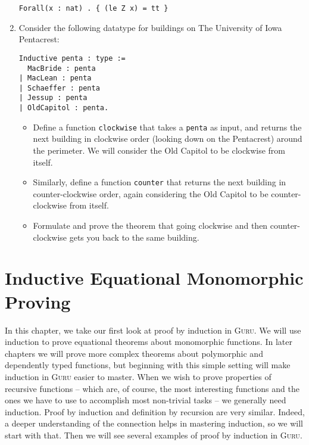 \documentclass{book}[12pt]
\newcommand{\guru}[0]{\textsc{Guru}\xspace}
\begin{document}
\begin{enumerate}
\begin{verbatim}
Forall(x : nat) . { (le Z x) = tt }
\end{verbatim}

\item Consider the following datatype for buildings on The University of Iowa Pentacrest:

\begin{verbatim}
Inductive penta : type :=
  MacBride : penta
| MacLean : penta
| Schaeffer : penta
| Jessup : penta
| OldCapitol : penta.
\end{verbatim}

\begin{itemize}

\item Define a function \texttt{clockwise} that takes a \texttt{penta}
as input, and returns the next building in clockwise order (looking
down on the Pentacrest) around the perimeter.  We will consider the
Old Capitol to be clockwise from itself.

\item Similarly, define a function \texttt{counter} that returns the
next building in counter-clockwise order, again considering the Old
Capitol to be counter-clockwise from itself.

\item Formulate and prove the theorem that going clockwise and then
counter-clockwise gets you back to the same building.

\end{itemize}

\end{enumerate}

\chapter{Inductive Equational Monomorphic Proving}
\label{ch4}

In this chapter, we take our first look at proof by induction in
\guru.  We will use induction to prove equational theorems about
monomorphic functions.  In later chapters we will prove more complex
theorems about polymorphic and dependently typed functions, but
beginning with this simple setting will make induction in \guru easier
to master.  When we wish to prove properties of recursive functions --
which are, of course, the most interesting functions and the ones we
have to use to accomplish most non-trivial tasks -- we generally need
induction.  Proof by induction and definition by recursion are very
similar.  Indeed, a deeper understanding of the connection helps in
mastering induction, so we will start with that.  Then we will see
several examples of proof by induction in \guru.
\end{document}
